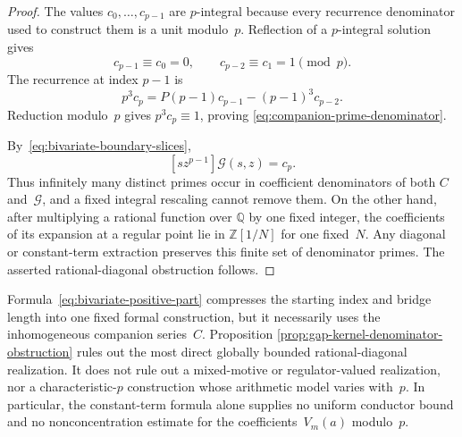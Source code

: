 \begin{proof}
The values $c_0,\ldots,c_{p-1}$ are $p$-integral because every recurrence
denominator used to construct them is a unit modulo~$p$.  Reflection of a
$p$-integral solution gives
\[
 c_{p-1}\equiv c_0=0,
 \qquad
 c_{p-2}\equiv c_1=1
 \pmod p.
\]
The recurrence at index $p-1$ is
\[
 p^3c_p=P(p-1)c_{p-1}-(p-1)^3c_{p-2}.
\]
Reduction modulo~$p$ gives $p^3c_p\equiv1$, proving
\eqref{eq:companion-prime-denominator}.

By~\eqref{eq:bivariate-boundary-slices},
\[
 [s z^{p-1}]\mathcal G(s,z)=c_p.
\]
Thus infinitely many distinct primes occur in coefficient denominators of
both $C$ and~$\mathcal G$, and a fixed integral rescaling cannot remove
them.  On the other hand, after multiplying a rational function over
$\mathbb Q$ by one fixed integer, the coefficients of its expansion at a
regular point lie in $\mathbb Z[1/N]$ for one fixed~$N$.  Any diagonal or
constant-term extraction preserves this finite set of denominator primes.
The asserted rational-diagonal obstruction follows.
\end{proof}

\begin{remark}
\label{rem:bivariate-kernel-scope}
Formula~\eqref{eq:bivariate-positive-part} compresses the starting index
and bridge length into one fixed formal construction, but it necessarily
uses the inhomogeneous companion series~$C$.  Proposition
\ref{prop:gap-kernel-denominator-obstruction} rules out the most direct
globally bounded rational-diagonal realization.  It does not rule out a
mixed-motive or regulator-valued realization, nor a characteristic-$p$
construction whose arithmetic model varies with~$p$.  In particular, the
constant-term formula alone supplies no uniform conductor bound and no
nonconcentration estimate for the coefficients~$V_m(a)$ modulo~$p$.
\end{remark}

